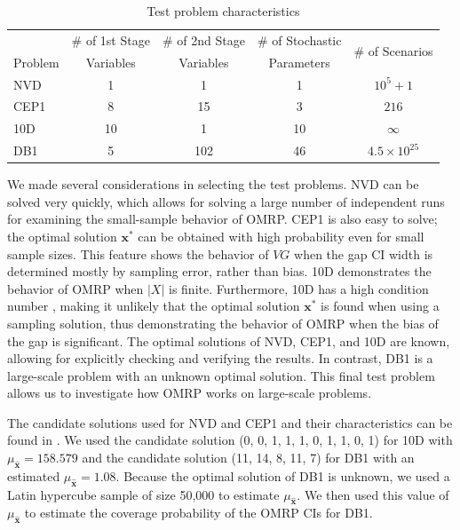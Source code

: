 \documentclass[12pt]{article}
\newcommand{\x}{\mathbf{x}}
\newcommand{\xh}{{\hat{\x}}}
\newcommand{\xs}{\x^*}
\begin{document}
\begin{table}[thb]
\centering
\footnotesize
\begin{tabular}{lcccc}
\hline
& \# of 1st Stage & \# of 2nd Stage & \# of Stochastic & \multirow{2}{*}{\# of Scenarios} \\
Problem & Variables & Variables & Parameters & \\
\cmidrule(r){1-1} \cmidrule(l){2-5}
NVD 	& 1     	& 1     	& 1   	& $10^5 + 1$ \\
CEP1 	& 8     	& 15   	& 3   	& $216$ \\
10D 	& 10     & 1     	& 10   	& $\infty$ \\
DB1 	& 5   	& 102   	& 46   	& $4.5\times 10^{25}$ \\
\hline
\end{tabular}
\caption{Test problem characteristics}
\label{tb:test_problems}
\end{table}



We made several considerations in selecting the test problems.
NVD can be solved very quickly, which allows for solving a large number of independent runs for examining the small-sample behavior of OMRP.
CEP1 is also easy to solve; the optimal solution $\xs$ can be obtained with high probability even for small sample sizes.
This feature shows the behavior of $VG$ when the gap CI width is determined mostly by sampling error, rather than bias.
10D demonstrates the behavior of OMRP when $|X|$ is finite.
Furthermore, 10D has a high condition number \citep{kleywegt2002sample}, making it unlikely that the optimal solution $\xs$ is found when using a sampling solution, thus demonstrating the behavior of OMRP when the bias of the gap is significant.
The optimal solutions of NVD, CEP1, and 10D are known, allowing for explicitly checking and verifying the results.
In contrast, DB1 is a large-scale problem with an unknown optimal solution.
This final test problem allows us to investigate how OMRP works on large-scale problems.


The candidate solutions used for NVD and CEP1 and their characteristics can be found in \citep{Bayraksan2006}.
We used the candidate solution (0, 0, 1, 1, 1, 0, 1, 1, 0, 1) for 10D with $\mu_{\xh} = 158.579$ and the candidate solution (11, 14, 8, 11, 7) for DB1 with an estimated $\mu_{\xh} = 1.08$. 
Because the optimal solution of DB1 is unknown, we used a Latin hypercube sample of size 50,000 to estimate $\mu_{\xh}$.
We then used this value of $\mu_{\xh}$ to estimate the coverage probability of the OMRP CIs for DB1.
\end{document}
